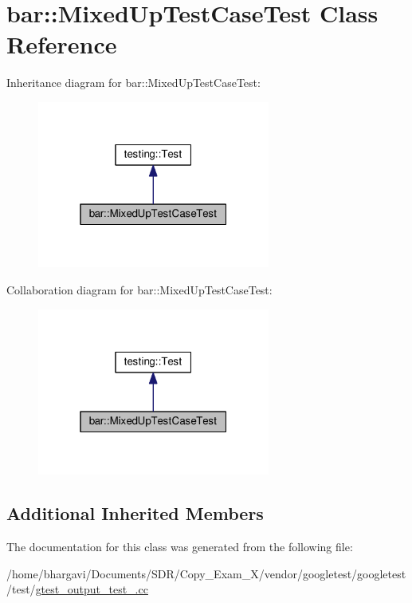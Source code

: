 \hypertarget{classbar_1_1_mixed_up_test_case_test}{}\section{bar\+:\+:Mixed\+Up\+Test\+Case\+Test Class Reference}
\label{classbar_1_1_mixed_up_test_case_test}


Inheritance diagram for bar\+:\+:Mixed\+Up\+Test\+Case\+Test\+:
\nopagebreak
\begin{figure}[H]
\begin{center}
\leavevmode
\includegraphics[width=217pt]{classbar_1_1_mixed_up_test_case_test__inherit__graph}
\end{center}
\end{figure}


Collaboration diagram for bar\+:\+:Mixed\+Up\+Test\+Case\+Test\+:
\nopagebreak
\begin{figure}[H]
\begin{center}
\leavevmode
\includegraphics[width=217pt]{classbar_1_1_mixed_up_test_case_test__coll__graph}
\end{center}
\end{figure}
\subsection*{Additional Inherited Members}


The documentation for this class was generated from the following file\+:\begin{DoxyCompactItemize}
\item 
/home/bhargavi/\+Documents/\+S\+D\+R/\+Copy\+\_\+\+Exam\+\_\+X/vendor/googletest/googletest/test/\hyperlink{gtest__output__test___8cc}{gtest\+\_\+output\+\_\+test\+\_\+.\+cc}\end{DoxyCompactItemize}
